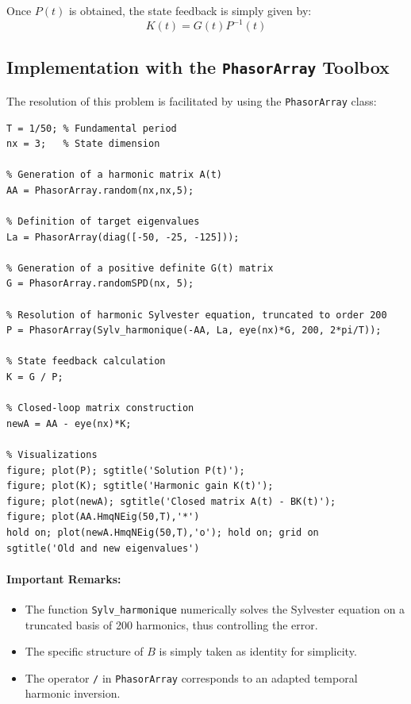 \documentclass[11pt,a4paper]{article}
\begin{document}
Once $P(t)$ is obtained, the state feedback is simply given by:
\begin{equation}
K(t) = G(t) P^{-1}(t)
\end{equation}

\subsection{Implementation with the \texttt{PhasorArray} Toolbox}

The resolution of this problem is facilitated by using the \texttt{PhasorArray} class:

\begin{lstlisting}[style=matlabstyle]
T = 1/50; % Fundamental period
nx = 3;   % State dimension

% Generation of a harmonic matrix A(t)
AA = PhasorArray.random(nx,nx,5);

% Definition of target eigenvalues
La = PhasorArray(diag([-50, -25, -125]));

% Generation of a positive definite G(t) matrix
G = PhasorArray.randomSPD(nx, 5);

% Resolution of harmonic Sylvester equation, truncated to order 200
P = PhasorArray(Sylv_harmonique(-AA, La, eye(nx)*G, 200, 2*pi/T));

% State feedback calculation
K = G / P;

% Closed-loop matrix construction
newA = AA - eye(nx)*K;

% Visualizations
figure; plot(P); sgtitle('Solution P(t)');
figure; plot(K); sgtitle('Harmonic gain K(t)');
figure; plot(newA); sgtitle('Closed matrix A(t) - BK(t)');
figure; plot(AA.HmqNEig(50,T),'*')
hold on; plot(newA.HmqNEig(50,T),'o'); hold on; grid on
sgtitle('Old and new eigenvalues')
\end{lstlisting}

\paragraph{Important Remarks:}
\begin{itemize}
    \item The function \texttt{Sylv\_harmonique} numerically solves the Sylvester equation on a truncated basis of 200 harmonics, thus controlling the error.
    \item The specific structure of $B$ is simply taken as identity for simplicity.
    \item The operator \texttt{/} in \texttt{PhasorArray} corresponds to an adapted temporal harmonic inversion.
\end{itemize}
\end{document}
